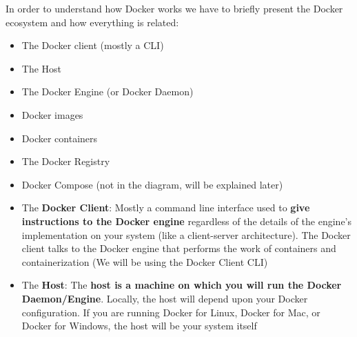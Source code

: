 \documentclass[handout]{beamer}[10pt, usepdftitle=false]
\begin{document}
	\begin{frame}
	
	In order to understand how Docker works we have to briefly present the Docker ecosystem and how everything is related:
	\vspace*{0.6em}


	\begin{itemize}
	\item{The Docker client (mostly a CLI)}
	\item{The Host}
	\item{The Docker Engine (or Docker Daemon)}
	\item{Docker images}
	\item{Docker containers}
	\item{The Docker Registry}
	\item{Docker Compose (not in the diagram, will be explained later)}	
	\end{itemize}

	
	\end{frame}
	
	\begin{frame}
	\begin{itemize}	
	\item{The \textbf{Docker Client}: Mostly a command line interface used to \textbf{give instructions to the Docker engine} regardless of the details of the engine's implementation on your system (like a client-server architecture). The Docker client talks to the Docker engine that performs the work of containers and containerization (We will be using the Docker Client CLI)}
	\end{itemize}
	\begin{itemize}
	\item{The \textbf{Host}: The \textbf{host is a machine on which you will run the Docker Daemon/Engine}. Locally, the host will depend upon your Docker configuration. If you are running Docker for Linux, Docker for Mac, or Docker for Windows, the host will be your system itself}
\end{itemize}		
	
	\end{frame}	
	
\end{document}
